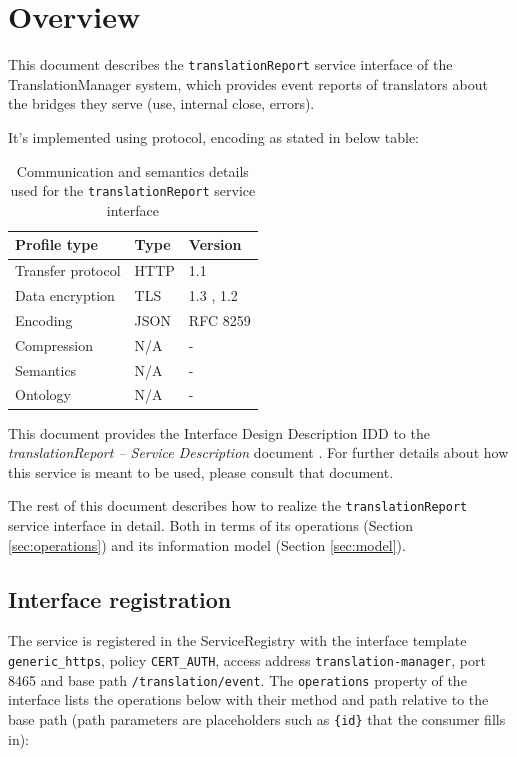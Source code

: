 \documentclass[a4paper]{arrowhead}
\begin{document}
\section{Overview}
\label{sec:overview}

This document describes the \texttt{translationReport} service interface of the TranslationManager system, which provides event reports of translators about the bridges they serve (use, internal close, errors).

It's implemented using protocol, encoding as stated in below table:
\begin{table}[ht!]
  \centering
  \begin{tabular}{|l|l|l|}
    \hline
    \rowcolor{gray!33} Profile type & Type & Version \\ \hline
    Transfer protocol & HTTP & 1.1 \cite{rfc9112} \\ \hline
    Data encryption & TLS & 1.3 \cite{rfc8446}, 1.2 \cite{rfc5246} \\ \hline
    Encoding & JSON & RFC 8259 \cite{rfc8259} \\ \hline
    Compression & N/A & - \\ \hline
    Semantics & N/A & - \\ \hline
    Ontology & N/A & - \\ \hline
  \end{tabular}
  \caption{Communication and semantics details used for the \texttt{translationReport} service interface}
  \label{tab:comunication_semantics_profile}
\end{table}

This document provides the Interface Design Description IDD to the \textit{translationReport -- Service Description} document \cite{tm-translationReport-sd}.
For further details about how this service is meant to be used, please consult that document.

The rest of this document describes how to realize the \texttt{translationReport} service
interface in detail. Both in terms of its operations (Section \ref{sec:operations}) and its information model (Section \ref{sec:model}).

\subsection{Interface registration}

The service is registered in the ServiceRegistry with the interface template \texttt{generic\_\allowbreak{}https}, policy \texttt{CERT\_\allowbreak{}AUTH}, access address \texttt{translation-\allowbreak{}manager}, port 8465 and base path \texttt{/\allowbreak{}translation/\allowbreak{}event}. The \texttt{operations} property of the interface lists the operations below with their method and path relative to the base path (path parameters are placeholders such as \texttt{\{id\}} that the consumer fills in):
\end{document}
